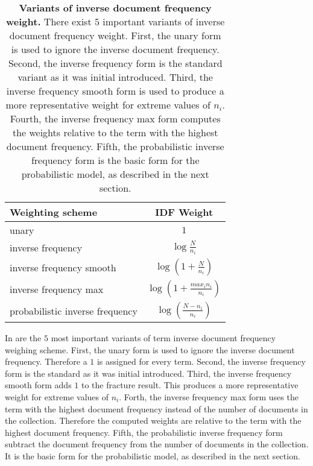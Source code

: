 \begin{table}[b!]
    \centering
    \begin{tabular}{ l c }
      \toprule
      \textbf{Weighting scheme} & \textbf{IDF Weight} \\ \midrule
      unary  & $1$  \\
      inverse frequency & $\log \frac{N}{n_i}$  \\
      inverse frequency smooth & $\log (1 + \frac{N}{n_i})$  \\
      inverse frequency max & $\log (1 + \frac{max_i n_i}{n_i})$  \\
      probabilistic inverse frequency & $\log (\frac{N - n_i}{n_i})$  \\
      \bottomrule
    \end{tabular}
  \caption[Variants of inverse document frequency weight]{\textbf{Variants of inverse document frequency weight.} There exist $5$ important variants of inverse document frequency weight. First, the unary form is used to ignore the inverse document frequency. Second, the inverse frequency form is the standard variant as it was initial introduced. Third, the inverse frequency smooth form is used to produce a more representative weight for extreme values of $n_i$. Fourth, the inverse frequency max form computes the weights relative to the term with the highest document frequency. Fifth, the probabilistic inverse frequency form is the basic form for the probabilistic model, as described in the next section.}
  \label{tbl:idf_variants}
\end{table}
In  are the $5$ most important variants of term inverse document frequency weighing scheme. First, the unary form is used to ignore the inverse document frequency. Therefore a $1$ is assigned for every term. Second, the inverse frequency form is the standard as it was initial introduced. Third, the inverse frequency smooth form adds $1$ to the fracture result. This produces a more representative weight for extreme values of $n_i$. Forth, the inverse frequency max form uses the term with the highest document frequency instead of the number of documents in the collection. Therefore the computed weights are relative to the term with the highest document frequency. Fifth, the probabilistic inverse frequency form subtract the document frequency from the number of documents in the collection. It is the basic form for the probabilistic model, as described in the next section.


